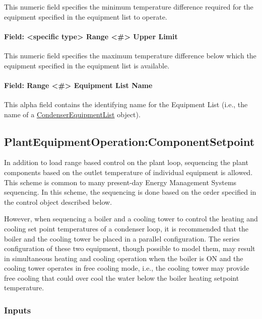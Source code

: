 This numeric field specifies the minimum temperature difference required for the equipment specified in the equipment list to operate.

\paragraph{Field: \textless{}specific type\textgreater{} Range \textless{}\#\textgreater{} Upper Limit}\label{field-specific-type-range-upper-limit-1}

This numeric field specifies the maximum temperature difference below which the equipment specified in the equipment list is available.

\paragraph{Field: Range \textless{}\#\textgreater{} Equipment List Name}\label{field-range-equipment-list-name-2}

This alpha field contains the identifying name for the Equipment List (i.e., the name of a \hyperref[condenserequipmentlist]{CondenserEquipmentList} object).

\subsection{PlantEquipmentOperation:ComponentSetpoint}\label{plantequipmentoperationcomponentsetpoint}

In addition to load range based control on the plant loop, sequencing the plant components based on the outlet temperature of individual equipment is allowed. This scheme is common to many present-day Energy Management Systems sequencing. In this scheme, the sequencing is done based on the order specified in the control object described below.

However, when sequencing a boiler and a cooling tower to control the heating and cooling set point temperatures of a condenser loop, it is recommended that the boiler and the cooling tower be placed in a parallel configuration. The series configuration of these two equipment, though possible to model them, may result in simultaneous heating and cooling operation when the boiler is ON and the cooling tower operates in free cooling mode, i.e., 
the cooling tower may provide free cooling that could over cool the water below the boiler heating setpoint temperature.  


\subsubsection{Inputs}\label{inputs-12-011}

